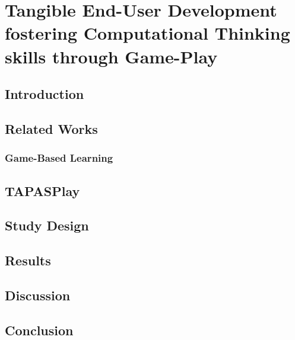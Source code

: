 %
\chapter{Tangible End-User Development fostering Computational Thinking skills through Game-Play}
\label{sec:tapasplay}

\section{Introduction}

\section{Related Works}

\subsection{Game-Based Learning}

\section{TAPASPlay}

\section{Study Design}

\section{Results}

\section{Discussion}

\section{Conclusion}